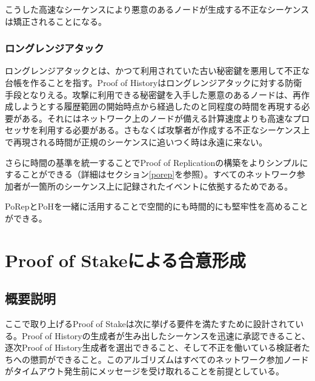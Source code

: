 \documentclass[12pt]{ltjsarticle}
\begin{document}
こうした高速なシーケンスにより悪意のあるノードが生成する不正なシーケンスは矯正されることになる。

\subsubsection{ロングレンジアタック}

ロングレンジアタックとは、かつて利用されていた古い秘密鍵を悪用して不正な台帳を作ることを指す\cite{casper}。Proof of Historyはロングレンジアタックに対する防衛手段となりえる。攻撃に利用できる秘密鍵を入手した悪意のあるノードは、再作成しようとする履歴範囲の開始時点から経過したのと同程度の時間を再現する必要がある。それにはネットワーク上のノードが備える計算速度よりも高速なプロセッサを利用する必要がある。さもなくば攻撃者が作成する不正なシーケンス上で再現される時間が正規のシーケンスに追いつく時は永遠に来ない。

さらに時間の基準を統一することでProof of Replicationの構築をよりシンプルにすることができる（詳細はセクション\ref{porep}を参照）。すべてのネットワーク参加者が一箇所のシーケンス上に記録されたイベントに依拠するためである。

PoRepとPoHを一緒に活用することで空間的にも時間的にも堅牢性を高めることができる。

\section{Proof of Stakeによる合意形成}\label{proof_of_stake}
\subsection{概要説明}
ここで取り上げるProof of Stakeは次に挙げる要件を満たすために設計されている。Proof of Historyの生成者が生み出したシーケンスを迅速に承認できること、逐次Proof of History生成者を選出できること、そして不正を働いている検証者たちへの懲罰ができること。このアルゴリズムはすべてのネットワーク参加ノードがタイムアウト発生前にメッセージを受け取れることを前提としている。
\end{document}
